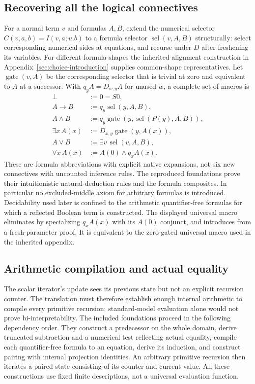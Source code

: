 \documentclass[11pt,letterpaper]{article}
\theoremstyle{definition}\newtheorem{definition}[theorem]{Definition}
\theoremstyle{remark}\newtheorem{remark}[theorem]{Remark}
\begin{document}
\subsection{Recovering all the logical connectives}

For a normal term $v$ and formulas $A,B$, extend the numerical selector
$C(v,a,b)=I(v,a;u.b)$ to a formula selector
$\operatorname{sel}(v,A,B)$ structurally: select corresponding numerical
sides at equations, and recurse under $D$ after freshening its variables.
For different formula shapes the inherited alignment construction in
Appendix~\ref{sec:choice-introduction} supplies common-shape representatives.
Let $\operatorname{gate}(v,A)$ be the corresponding selector that is trivial
at zero and equivalent to $A$ at a successor. With
$q_yA=D_{w,y}A$ for unused $w$, a complete set of macros is
\begin{align*}
 \bot &:= 0=S0,\\
 A\to B &:= q_y\operatorname{sel}(y,A,B),\\
 A\wedge B &:= q_y\operatorname{gate}
       (y,\operatorname{sel}(P(y),A,B)),\\
 \exists x\,A(x) &:= D_{x,y}\operatorname{gate}(y,A(x)),\\
 A\vee B &:= \exists v\,\operatorname{sel}(v,A,B),\\
 \forall x\,A(x) &:= A(0)\wedge q_x A(x).
\end{align*}
These are formula abbreviations with explicit native expansions, not six
new connectives with uncounted inference rules. The reproduced foundations
prove their intuitionistic natural-deduction rules and the formula
composites. In particular no excluded-middle axiom for arbitrary formulas
is introduced. Decidability used later is confined to the arithmetic
quantifier-free formulas for which a reflected Boolean term is constructed.
The displayed universal macro eliminates by specializing $q_xA(x)$ with
its $A(0)$ conjunct, and introduces from a fresh-parameter proof. It is
equivalent to the zero-gated universal macro used in the inherited appendix.

\subsection{Arithmetic compilation and actual equality}

The scalar iterator's update sees its previous state but not an explicit
recursion counter. The translation must therefore establish enough internal
arithmetic to compile every primitive recursion; standard-model evaluation
alone would not prove bi-interpretability. The included foundations proceed
in the following dependency order. They construct a predecessor on the whole
domain, derive truncated subtraction and a numerical test reflecting actual
equality, compile each quantifier-free formula to an equation, derive its
induction, and construct pairing with internal projection identities.
An arbitrary primitive recursion then iterates a paired state consisting of
its counter and current value. All these constructions use fixed finite
descriptions, not a universal evaluation function.
\end{document}

